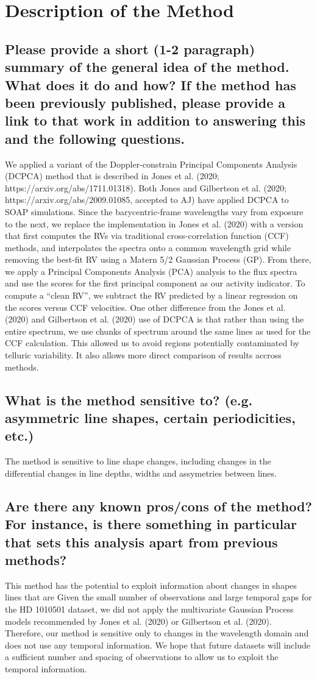 \documentclass[12pt]{article}
\begin{document}
\section{Description of the Method}
\subsection{Please provide a short (1-2 paragraph) summary of the general idea of the method.  What does it do and how?  If the method has been previously published, please provide a link to that work in addition to answering this and the following questions.}

We applied a variant of the Doppler-constrain Principal Components Analysis (DCPCA) method that is described in Jones et al. (2020; https://arxiv.org/abs/1711.01318).
Both Jones and Gilbertson et al. (2020; https://arxiv.org/abs/2009.01085, accepted to AJ) have applied DCPCA to SOAP simulations.
Since the barycentric-frame wavelengths vary from exposure to the next, we replace the implementation in Jones et al. (2020) with a version that first computes the RVs via traditional cross-correlation function (CCF) methods, and interpolates the spectra onto a common wavelength grid while removing the best-fit RV using a Matern 5/2 Gaussian Process (GP).
From there, we apply a Principal Components Analysis (PCA) analysis to the flux spectra and use the scores for the first principal component as our activity indicator.
To compute a ``clean RV'', we subtract the RV predicted by a linear regression on the scores versus CCF velocities.
One other difference from the Jones et al. (2020) and Gilbertson et al. (2020) use of DCPCA is that rather than using the entire spectrum, we use chunks of spectrum around the same lines as used for the CCF calculation.
This allowed us to avoid regions potentially contaminated by telluric variability.
It also allows more direct comparison of results accross methods.


\subsection{What is the method sensitive to? (e.g. asymmetric line shapes, certain periodicities, etc.)}
The method is sensitive to line shape changes, including changes in the differential changes in line depths, widths and assymetries between lines.

\subsection{Are there any known pros/cons of the method?  For instance, is there something in particular that sets this analysis apart from previous methods?}
This method has the potential to exploit information about changes in shapes lines that are
Given the small number of observations and large temporal gaps for the HD 1010501 dataset, we did not apply the multivariate Gaussian Process models recommended by Jones et al. (2020) or Gilbertson et al. (2020).
Therefore, our method is sensitive only to changes in the wavelength domain and does not use any temporal information.
We hope that future datasets will include a sufficient number and spacing of observations to allow us to exploit the temporal information.
\end{document}
